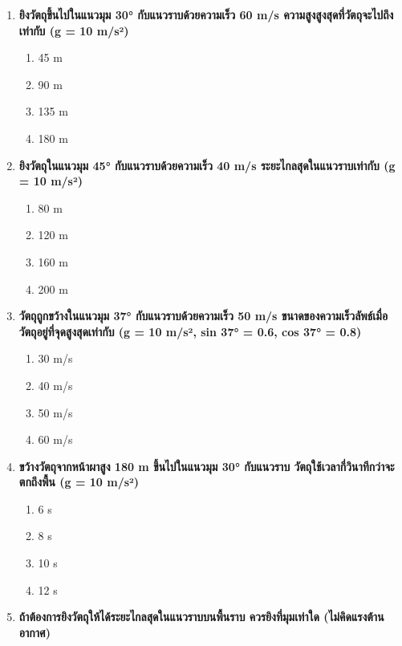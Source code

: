 \documentclass[12pt]{article}
\begin{document}
\begin{enumerate}
\begin{enumerate}[label=\alph*)]
\item ความเร็วในแนวราบเปลี่ยนแปลงตลอดเวลา
\item ความเร็วในแนวดิ่งเปลี่ยนแปลงตลอดเวลา
\item ความเร็วในแนวราบและแนวดิ่งเปลี่ยนแปลงเท่ากัน
\item ความเร็วในแนวดิ่งคงที่
\end{enumerate}
\item \textbf{ยิงวัตถุขึ้นไปในแนวมุม 30° กับแนวราบด้วยความเร็ว 60 m/s ความสูงสูงสุดที่วัตถุจะไปถึงเท่ากับ (g = 10 m/s²)}
\begin{enumerate}[label=\alph*)]
\item 45 m
\item 90 m
\item 135 m
\item 180 m
\end{enumerate}
\item \textbf{ยิงวัตถุในแนวมุม 45° กับแนวราบด้วยความเร็ว 40 m/s ระยะไกลสุดในแนวราบเท่ากับ (g = 10 m/s²)}
\begin{enumerate}[label=\alph*)]
\item 80 m
\item 120 m
\item 160 m
\item 200 m
\end{enumerate}
\item \textbf{วัตถุถูกขว้างในแนวมุม 37° กับแนวราบด้วยความเร็ว 50 m/s ขนาดของความเร็วลัพธ์เมื่อวัตถุอยู่ที่จุดสูงสุดเท่ากับ (g = 10 m/s², sin 37° = 0.6, cos 37° = 0.8)}
\begin{enumerate}[label=\alph*)]
\item 30 m/s
\item 40 m/s
\item 50 m/s
\item 60 m/s
\end{enumerate}
\item \textbf{ขว้างวัตถุจากหน้าผาสูง 180 m ขึ้นไปในแนวมุม 30° กับแนวราบ วัตถุใช้เวลากี่วินาทีกว่าจะตกถึงพื้น (g = 10 m/s²)}
\begin{enumerate}[label=\alph*)]
\item 6 s
\item 8 s
\item 10 s
\item 12 s
\end{enumerate}
\item \textbf{ถ้าต้องการยิงวัตถุให้ได้ระยะไกลสุดในแนวราบบนพื้นราบ ควรยิงที่มุมเท่าใด (ไม่คิดแรงต้านอากาศ)}
\begin{enumerate}[label=\alph*)]

\end{enumerate}
\end{enumerate}
\end{document}
